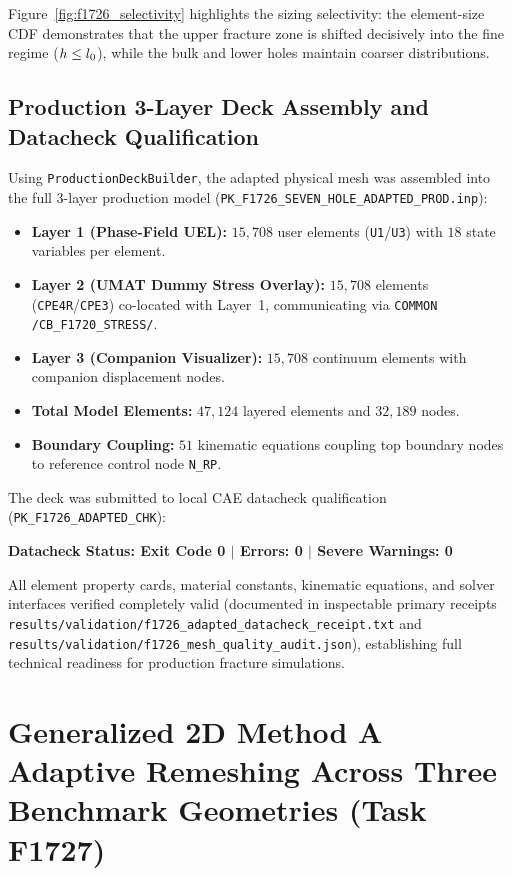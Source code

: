 Figure~\ref{fig:f1726_selectivity} highlights the sizing selectivity: the element-size CDF demonstrates that the upper fracture zone is shifted decisively into the fine regime ($h \le l_0$), while the bulk and lower holes maintain coarser distributions.

\subsection{Production 3-Layer Deck Assembly and Datacheck Qualification}
\label{subsec:f1726_production_deck}

Using \texttt{ProductionDeckBuilder}, the adapted physical mesh was assembled into the full 3-layer production model (\texttt{PK\_F1726\_SEVEN\_HOLE\_ADAPTED\_PROD.inp}):
\begin{itemize}
  \item \textbf{Layer 1 (Phase-Field UEL):} $15{,}708$ user elements (\texttt{U1}/\texttt{U3}) with $18$ state variables per element.
  \item \textbf{Layer 2 (UMAT Dummy Stress Overlay):} $15{,}708$ elements (\texttt{CPE4R}/\texttt{CPE3}) co-located with Layer~1, communicating via \texttt{COMMON /CB\_F1720\_STRESS/}.
  \item \textbf{Layer 3 (Companion Visualizer):} $15{,}708$ continuum elements with companion displacement nodes.
  \item \textbf{Total Model Elements:} $47{,}124$ layered elements and $32{,}189$ nodes.
  \item \textbf{Boundary Coupling:} $51$ kinematic equations coupling top boundary nodes to reference control node \texttt{N\_RP}.
\end{itemize}

The deck was submitted to local \Abaqus CAE datacheck qualification (\texttt{PK\_F1726\_ADAPTED\_CHK}):
\begin{center}
  \textbf{Datacheck Status: Exit Code 0 \quad $\vert$ \quad Errors: 0 \quad $\vert$ \quad Severe Warnings: 0}
\end{center}
All element property cards, material constants, kinematic equations, and solver interfaces verified completely valid (documented in inspectable primary receipts \texttt{results/validation/f1726\_adapted\_datacheck\_receipt.txt} and \texttt{results/validation/f1726\_mesh\_quality\_audit.json}), establishing full technical readiness for production fracture simulations.

\section{Generalized 2D Method A Adaptive Remeshing Across Three Benchmark Geometries (Task F1727)}
\label{sec:f1727_three_geometries}

